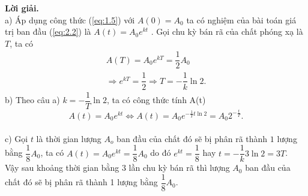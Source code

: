 \textbf{Lời giải.}\\
a) Áp dụng công thức (\ref{eq:1.5}) với $A(0)={{A}_{0}}$  ta có nghiệm của bài toán giá trị ban đầu (\ref{eq:2.2}) là $A(t)={{A}_{0}}{{e}^{kt}}$ . Gọi chu kỳ bán rã của chất phóng xạ là $T$, ta có
$$\begin{array}{lll}
A(T)={{A}_{0}}{{e}^{kT}}=\dfrac{1}{2}{{A}_{0}}\\ \Rightarrow {{e}^{kT}}=\dfrac{1}{2}\Rightarrow T=-\dfrac{1}{k}\ln 2.
\end{array}$$
b) Theo câu a) $k=-\dfrac{1}{T}\ln 2$, ta có công thức tính A(t)\\ $$A(t)={{A}_{0}}{{e}^{kt}} \Leftrightarrow A(t)={{A}_{0}}{{e}^{-\frac{1}{T}t\ln 2}}={{A}_{0}}{{2}^{-\frac{t}{T}}}.$$\\
c) Gọi $t$ là thời gian lượng $A_o$ ban đầu của chất đó sẽ bị phân rã thành $1$ lượng bằng $\dfrac{1}{8}{{A}_{0}}$, ta có $A(t)={{A}_{0}}{{e}^{kt}}=\dfrac{1}{8}{{A}_{0}}$ do đó  ${{e}^{kt}}=\dfrac{1}{8}$ hay $t=-\dfrac{1}{k}3\ln 2=3T$.\\
Vậy sau khoảng thời gian bằng $3$ lần chu kỳ bán rã thì lượng ${{A}_{0}}$ ban đầu của chất đó sẽ bị phân rã thành 1 lượng bằng $\dfrac{1}{8}{{A}_{0}}$.
